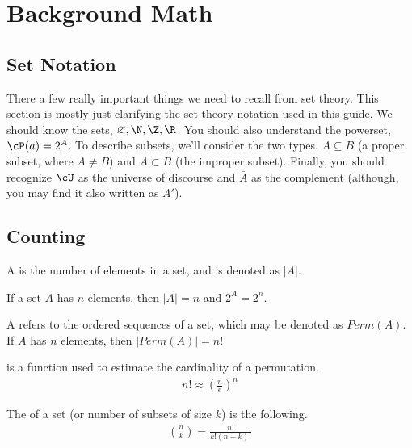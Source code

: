 \section{Background Math}

\subsection{Set Notation}
There a few really important things we need to recall from set theory. This section is mostly just clarifying the set theory notation used in this
guide. We should know the sets, $\varnothing, \N, \Z, \R$. You should also understand the powerset, $\cP(a) = 2^A$. To describe subsets, we'll consider 
the two types. $A \subseteq B$ (a proper subset, where $A \neq B$) and $A \subset B$ (the improper subset). Finally, you should recognize $\cU$ as the
universe of discourse and $\bar A$ as the complement (although, you may find it also written as $A'$).

\subsection{Counting}
\begin{defn}
    A  is the number of elements in a set, and is denoted as $|A|$.
\end{defn}
\begin{example}
    If a set $A$ has $n$ elements, then $|A| = n$ and $2^A = 2^n$.
\end{example}

\begin{defn}
    A  refers to the ordered sequences of a set, which may be denoted as $Perm(A)$.
    If $A$ has $n$ elements, then $|Perm(A)| = n!$
\end{defn}
\begin{defn}
     is a function used to estimate the cardinality of a permutation.
    \begin{align*}
        n! \approx \left( \frac{n}{e} \right)^n
    \end{align*}
\end{defn}

\begin{defn}
    The  of a set (or number of subsets of size $k$) is the following.
    \begin{align*}
        \binom{n}{k} = \frac{n!}{k!(n - k)!} 
    \end{align*}
\end{defn}

